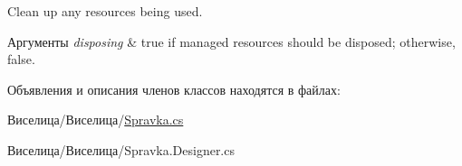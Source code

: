 Clean up any resources being used. 


\begin{DoxyParams}{Аргументы}
{\em disposing} & true if managed resources should be disposed; otherwise, false.\\
\hline
\end{DoxyParams}


Объявления и описания членов классов находятся в файлах\+:\begin{DoxyCompactItemize}
\item 
Виселица/Виселица/\hyperlink{_spravka_8cs}{Spravka.\+cs}\item 
Виселица/Виселица/Spravka.\+Designer.\+cs\end{DoxyCompactItemize}
